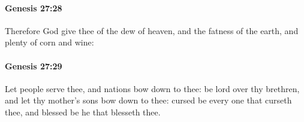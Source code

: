 		\paragraph{Genesis 27:28} %
			\label{GENESIS-27-28}

			Therefore God give thee of the dew of heaven, and the fatness of the earth, and plenty of corn and wine:


		\paragraph{Genesis 27:29} %
			\label{GENESIS-27-29}

			Let people serve thee, and nations bow down to thee: be lord over thy brethren, and let thy mother's sons bow down to thee: cursed be every one that curseth thee, and blessed be he that blesseth thee.


